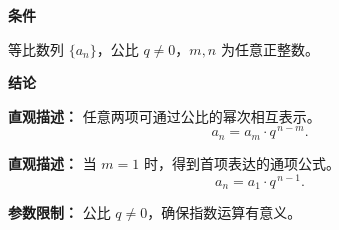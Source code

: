 \begin{statementbox}

	\textbf{\textcolor{CStatement}{条件}}

	\begin{description}[style=nextline, leftmargin=2.8em, labelsep=0.5em, itemsep=0.35em]
		\item[\textbf{\textcolor{CStatement}{条件 1（公比非零）：}}] 等比数列 $\{a_n\}$，公比 $q \neq 0$，$m,n$ 为任意正整数。
	\end{description}

	\textbf{\textcolor{CStatement}{结论}}

	\begin{description}[style=nextline, leftmargin=2.8em, labelsep=0.5em, itemsep=0.45em]
		\item[\textbf{\textcolor{CStatement}{结论一（两项关系）：}}]
			\textbf{\textcolor{CStatement}{直观描述：}}
			任意两项可通过公比的幂次相互表示。
			\[
				a_n = a_m \cdot q^{\,n-m}.
			\]

		\item[\textbf{\textcolor{CStatement}{常见变形（通项特例）：}}]
			\textbf{\textcolor{CStatement}{直观描述：}}
			当 $m=1$ 时，得到首项表达的通项公式。
			\[
				a_n = a_1 \cdot q^{\,n-1}.
			\]
	\end{description}

	\textbf{\textcolor{CStatement}{参数限制：}}
	公比 $q \neq 0$，确保指数运算有意义。

\end{statementbox}
